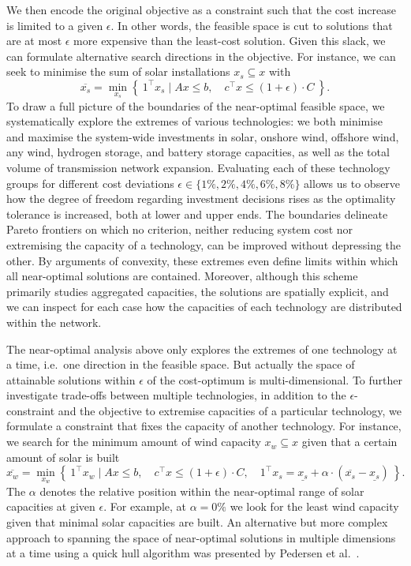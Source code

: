 We then encode the original objective as a constraint
such that the cost increase is limited to a given $\epsilon$.
In other words, the feasible space is cut to solutions that
are at most $\epsilon$ more expensive than the least-cost solution.
Given this slack, we can formulate alternative search directions in the objective.
For instance, we can seek to minimise the sum of solar installations $x_s \subseteq x$ with
\begin{equation}
    \overline{x_s} = \min_{x_s}\left\{\: 1^\top x_s \mid Ax\leq b,\quad c^\top x\leq (1+\epsilon)\cdot C \:\right\}.
\end{equation}
To draw a full picture of the boundaries of the near-optimal feasible space,
we systematically explore the extremes of various technologies:
we both minimise and maximise the system-wide investments in
solar, onshore wind, offshore wind, any wind, hydrogen storage, and battery storage
capacities, as well as the total volume of transmission network expansion.
Evaluating each of these technology groups for
different cost deviations $\epsilon \in \{1\%,2\%,4\%,6\%,8\%\}$
allows us to observe how the degree of freedom regarding investment decisions
rises as the optimality tolerance is increased, both at lower and upper ends.
The boundaries delineate Pareto frontiers on which no criterion,
neither reducing system cost nor extremising the capacity of a technology,
can be improved without depressing the other.
By arguments of convexity, these extremes even define limits
within which all near-optimal solutions are contained.
Moreover, although this scheme primarily studies aggregated capacities,
the solutions are spatially explicit, and we can inspect for each case
how the capacities of each technology are distributed within the network.



The near-optimal analysis above only explores the extremes of one technology at
a time, i.e.~one direction in the feasible space. But actually the space of
attainable solutions within $\epsilon$ of the cost-optimum is multi-dimensional.
To further investigate trade-offs between multiple technologies, in addition to the
$\epsilon$-constraint and the objective to extremise capacities of a particular
technology, we formulate a constraint that fixes the capacity of another
technology. For instance, we search for the minimum amount of wind capacity $x_w
\subseteq x$ given that a certain amount of solar is built
\begin{equation}
    \overline{x_w} = \min_{x_w}\left\{\:1^\top x_w \mid Ax\leq b,\quad c^\top x\leq (1+\epsilon)\cdot C, \quad 1^\top x_s = \underline{x_s} + \alpha \cdot (\overline{x_s}-\underline{x_s}) \:\right\}.
\end{equation}
The $\alpha$ denotes the relative position within the near-optimal
range of solar capacities at given $\epsilon$.
For example, at $\alpha=0\%$ we look for the least wind capacity
given that minimal solar capacities are built.
An alternative but more complex approach to spanning the space of near-optimal solutions in multiple dimensions at a time
using a quick hull algorithm was presented by Pedersen et al.~\cite{pedersen_modeling_2020}.

